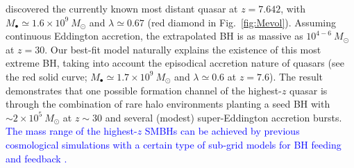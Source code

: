 \documentclass[twocolumn, twocolappendix]{aastex63}
\newcommand{\Msun}{M_\odot}
\newcommand{\red}[1]{\textcolor{red}{ #1}}
\newcommand{\blue}[1]{\textcolor{blue}{ #1}}
\begin{document}
\begin{CJK*}{UTF8}{gbsn}
\citet{2021ApJ...907L...1W} discovered the currently known most distant quasar at $z=7.642$,
with $M_{\bullet}\simeq 1.6\times 10^9~\Msun$ and $\lambda \simeq 0.67$ (red diamond in Fig.~\ref{fig:Mevol}).
Assuming continuous Eddington accretion, the extrapolated BH is as massive as $10^{4-6}~\Msun$ at $z= 30$. 
Our best-fit model naturally explains the existence of this most extreme BH,
taking into account the episodical accretion nature of quasars (see the red solid curve;
$M_\bullet \simeq 1.7\times 10^9~\Msun$ and $\lambda \simeq 0.6$ at $z=7.6$).
The result demonstrates that
one possible formation channel of the highest-$z$ quasar is through the combination of rare halo environments planting a seed BH 
with $\sim 2\times 10^5~\Msun$ at $z\sim 30$ and several (modest) super-Eddington accretion bursts.
\blue{
The mass range of the highest-$z$ SMBHs can be achieved by previous cosmological simulations with a certain type of
sub-grid models for BH feeding and feedback \citep{2017MNRAS.467.4243D,2018MNRAS.473.4003B,2019MNRAS.488.4004L}.
}



\end{CJK*}
\end{document}
